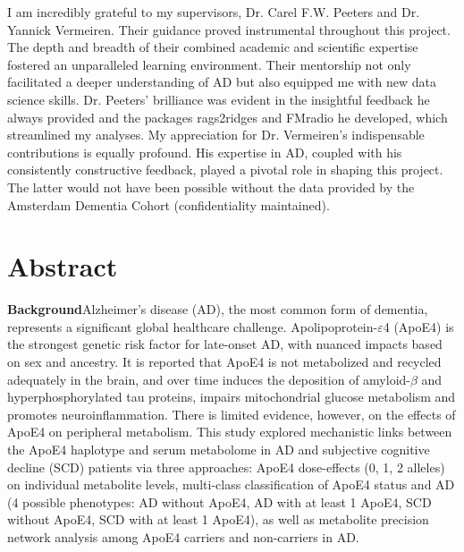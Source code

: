 \documentclass{amsart}
\begin{document}
I am incredibly grateful to my supervisors, Dr. Carel F.W. Peeters and Dr. Yannick Vermeiren. Their guidance proved instrumental throughout this project. The depth and breadth of their combined academic and scientific expertise fostered an unparalleled learning environment. Their mentorship not only facilitated a deeper understanding of AD but also equipped me with new data science skills. Dr. Peeters' brilliance was evident in the insightful feedback he always provided and the packages \textsf{rags2ridges} and \textsf{FMradio} he developed, which streamlined my analyses. My appreciation for Dr. Vermeiren's indispensable contributions is equally profound. His expertise in AD, coupled with his consistently constructive feedback, played a pivotal role in shaping this project. The latter would not have been possible without the data provided by the Amsterdam Dementia Cohort (confidentiality maintained).
\begin{figure}[!b]

\end{figure}
\newpage
{}
\section*{Abstract}
\textbf{Background}\hspace{.1cm}Alzheimer's disease (AD), the most common form of dementia, represents a significant global healthcare challenge. Apolipoprotein-$\varepsilon$4 (ApoE4) is the strongest genetic risk factor for late-onset AD, with nuanced impacts based on sex and ancestry. It is reported that ApoE4 is not metabolized and recycled adequately in the brain, and over time induces the deposition of amyloid-$\beta$ and hyperphosphorylated tau proteins, impairs mitochondrial glucose metabolism and promotes neuroinflammation. There is limited evidence, however, on the effects of ApoE4 on peripheral metabolism. This study explored mechanistic links between the ApoE4 haplotype and serum metabolome in AD and subjective cognitive decline (SCD) patients via three approaches: ApoE4 dose-effects (0, 1, 2 alleles) on individual metabolite levels, multi-class classification of ApoE4 status and AD (4 possible phenotypes: AD without ApoE4, AD with at least 1 ApoE4, SCD without ApoE4, SCD with at least 1 ApoE4), as well as metabolite precision network analysis among ApoE4 carriers and non-carriers in AD.
\end{document}
